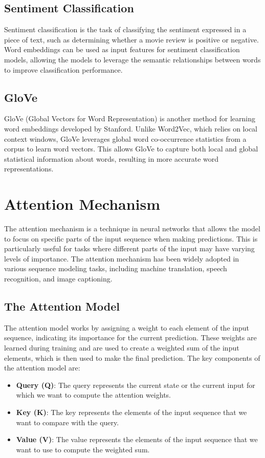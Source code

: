 \documentclass[12pt]{article}
\begin{document}
\subsection{Sentiment Classification}
Sentiment classification is the task of classifying the sentiment expressed in a piece of text, such as determining whether a movie review is positive or negative. Word embeddings can be used as input features for sentiment classification models, allowing the models to leverage the semantic relationships between words to improve classification performance.

\subsection{GloVe}
GloVe (Global Vectors for Word Representation) is another method for learning word embeddings developed by Stanford. Unlike Word2Vec, which relies on local context windows, GloVe leverages global word co-occurrence statistics from a corpus to learn word vectors. This allows GloVe to capture both local and global statistical information about words, resulting in more accurate word representations.

\section{Attention Mechanism}
The attention mechanism is a technique in neural networks that allows the model to focus on specific parts of the input sequence when making predictions. This is particularly useful for tasks where different parts of the input may have varying levels of importance. The attention mechanism has been widely adopted in various sequence modeling tasks, including machine translation, speech recognition, and image captioning.

\subsection{The Attention Model}
The attention model works by assigning a weight to each element of the input sequence, indicating its importance for the current prediction. These weights are learned during training and are used to create a weighted sum of the input elements, which is then used to make the final prediction. The key components of the attention model are:

\begin{itemize}
    \item \textbf{Query (Q)}: The query represents the current state or the current input for which we want to compute the attention weights.
    \item \textbf{Key (K)}: The key represents the elements of the input sequence that we want to compare with the query.
    \item \textbf{Value (V)}: The value represents the elements of the input sequence that we want to use to compute the weighted sum.
\end{itemize}
\end{document}
